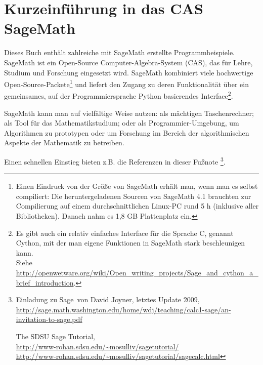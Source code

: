 
\newpage
\hypertarget{appendix-using-sage}{}
\section{Kurzeinführung in das CAS SageMath}
\label{s:appendix-using-sage}



Dieses Buch enthält zahlreiche mit SageMath erstellte Programmbeispiele. SageMath ist
ein Open-Source Computer-Algebra-System (CAS), das für Lehre, Studium und Forschung
eingesetzt wird.
SageMath kombiniert viele hochwertige Open-Source-Packete\footnote{%
Einen Eindruck von der Größe von SageMath erhält man, wenn man es selbst compiliert:
Die heruntergeladenen Sourcen von SageMath 4.1 brauchten zur Compilierung auf einem
durchschnittlichen Linux-PC rund 5 h (inklusive aller Bibliotheken).
Danach nahm es 1,8 GB Plattenplatz ein.
}
und liefert den Zugang zu deren Funktionalität über ein gemeinsames, auf der
Programmiersprache Python basierendes Interface\footnote{%
Es gibt auch ein relativ einfaches Interface für die Sprache C, genannt Cython,
mit der man eigene Funktionen in SageMath stark beschleunigen kann.\\
Siehe \url{http://openwetware.org/wiki/Open_writing_projects/Sage_and_cython_a_brief_introduction}.
}.

\noindent SageMath kann man auf vielfältige Weise nutzen:
als mächtigen Taschenrechner; als Tool für das Mathematikstudium;
oder als Programmier-Umgebung, um Algorithmen zu prototypen oder um Forschung im
Bereich der algorithmischen Aspekte der Mathematik zu betreiben.

\noindent Einen schnellen Einstieg bieten z.B. die Referenzen in dieser Fußnote%
\footnote{%
\noindent\hangindent=6pt\makebox[6pt][l]{-}\glqq Einladung zu Sage\grqq~von David Joyner, letztes Update 2009,\\
  \url{http://sage.math.washington.edu/home/wdj/teaching/calc1-sage/an-invitation-to-sage.pdf}

\noindent\hangindent=6pt\makebox[6pt][l]{-}\glqq The SDSU Sage Tutorial\grqq,\\
  \url{http://www-rohan.sdsu.edu/~mosulliv/sagetutorial/}\\
  \url{http://www-rohan.sdsu.edu/~mosulliv/sagetutorial/sagecalc.html}

  \noindent\hangindent=6pt
}.

